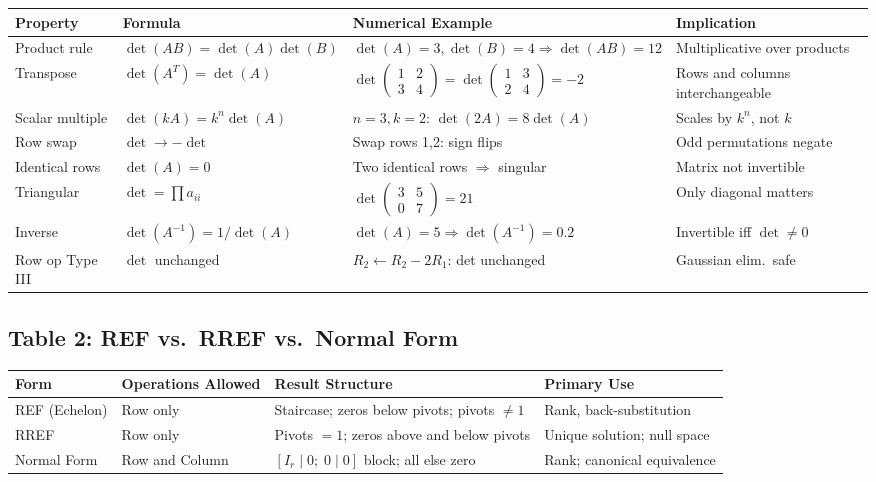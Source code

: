 \documentclass[12pt,a4paper]{article}
\begin{document}
\begin{center}
\begin{tabular}{@{}llll@{}}
\toprule
\textbf{Property} & \textbf{Formula} & \textbf{Numerical Example} & \textbf{Implication} \\
\midrule
Product rule    & $\det(AB)=\det(A)\det(B)$  & $\det(A)=3,\det(B)=4 \Rightarrow \det(AB)=12$ & Multiplicative over products \\
Transpose       & $\det(A^T)=\det(A)$         & $\det\begin{pmatrix}1&2\\3&4\end{pmatrix}=\det\begin{pmatrix}1&3\\2&4\end{pmatrix}=-2$ & Rows and columns interchangeable \\
Scalar multiple & $\det(kA)=k^n\det(A)$       & $n=3,k=2$: $\det(2A)=8\det(A)$               & Scales by $k^n$, not $k$ \\
Row swap        & $\det \to -\det$             & Swap rows 1,2: sign flips                     & Odd permutations negate \\
Identical rows  & $\det(A)=0$                  & Two identical rows $\Rightarrow$ singular      & Matrix not invertible \\
Triangular      & $\det=\prod a_{ii}$          & $\det\begin{pmatrix}3&5\\0&7\end{pmatrix}=21$ & Only diagonal matters \\
Inverse         & $\det(A^{-1})=1/\det(A)$    & $\det(A)=5 \Rightarrow \det(A^{-1})=0.2$      & Invertible iff $\det\neq0$ \\
Row op Type III & $\det$ unchanged             & $R_2\leftarrow R_2-2R_1$: det unchanged        & Gaussian elim.\ safe \\
\bottomrule
\end{tabular}
\end{center}

\subsection*{Table 2: REF vs.\ RREF vs.\ Normal Form}

\begin{center}
\begin{tabular}{@{}llll@{}}
\toprule
\textbf{Form} & \textbf{Operations Allowed} & \textbf{Result Structure} & \textbf{Primary Use} \\
\midrule
REF (Echelon)   & Row only         & Staircase; zeros below pivots; pivots $\neq1$     & Rank, back-substitution \\
RREF            & Row only         & Pivots $=1$; zeros above and below pivots          & Unique solution; null space \\
Normal Form     & Row and Column   & $[I_r \mid 0;\; 0 \mid 0]$ block; all else zero  & Rank; canonical equivalence \\
\bottomrule
\end{tabular}
\end{center}
\end{document}
